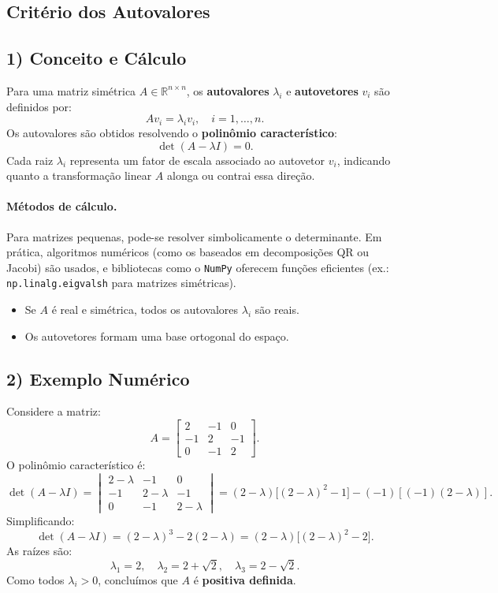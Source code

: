 \documentclass[9pt,a4paper]{extarticle}
\begin{document}
\subsection{Crit\'erio dos Autovalores}

\subsection*{1) Conceito e C\'alculo}
Para uma matriz sim\'etrica $A \in \mathbb{R}^{n\times n}$, os \textbf{autovalores} $\lambda_i$ e \textbf{autovetores} $v_i$ s\~ao definidos por:
\[
A v_i = \lambda_i v_i, \quad i=1,\dots,n.
\]
Os autovalores s\~ao obtidos resolvendo o \textbf{polin\^omio caracter\'istico}:
\[
\det(A - \lambda I) = 0.
\]
Cada raiz $\lambda_i$ representa um fator de escala associado ao autovetor $v_i$, indicando quanto a transforma\c c\~ao linear $A$ alonga ou contrai essa dire\c c\~ao.

\paragraph{M\'etodos de c\'alculo.}
Para matrizes pequenas, pode-se resolver simbolicamente o determinante.  
Em pr\'atica, algoritmos num\'ericos (como os baseados em decomposi\c c\~oes QR ou Jacobi) s\~ao usados, e bibliotecas como o \texttt{NumPy} oferecem fun\c c\~oes eficientes (ex.: \texttt{np.linalg.eigvalsh} para matrizes sim\'etricas).  

\begin{itemize}
  \item Se $A$ \'e real e sim\'etrica, todos os autovalores $\lambda_i$ s\~ao reais.
  \item Os autovetores formam uma base ortogonal do espa\c co.
\end{itemize}

\subsection*{2) Exemplo Num\'erico}

Considere a matriz:
\[
A = 
\begin{bmatrix}
2 & -1 & 0 \\
-1 & 2 & -1 \\
0 & -1 & 2
\end{bmatrix}.
\]
O polin\^omio caracter\'istico \'e:
\[
\det(A - \lambda I) =
\begin{vmatrix}
2-\lambda & -1 & 0 \\
-1 & 2-\lambda & -1 \\
0 & -1 & 2-\lambda
\end{vmatrix}
= (2-\lambda)\big[(2-\lambda)^2 - 1\big] - (-1)[(-1)(2-\lambda)].
\]
Simplificando:
\[
\det(A - \lambda I) = (2-\lambda)^3 - 2(2-\lambda) = (2-\lambda)\big[(2-\lambda)^2 - 2\big].
\]
As ra\'izes s\~ao:
\[
\lambda_1 = 2, \quad \lambda_2 = 2+\sqrt{2}, \quad \lambda_3 = 2-\sqrt{2}.
\]
Como todos $\lambda_i > 0$, conclu\'imos que $A$ \'e \textbf{positiva definida}.
\end{document}
